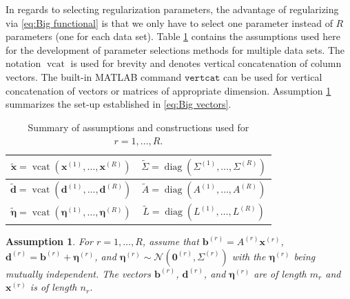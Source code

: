 \documentclass[12pt]{article}
\newcommand{\mA}{m}	%
\newcommand{\bVec}{\mathbf{b}}	%
\newcommand{\dVec}{\mathbf{d}}	%
\newcommand{\xVec}{\mathbf{x}}	%
\DeclareMathOperator{\diag}{diag}	%
\DeclareMathOperator{\vcat}{vcat}	%
\newcommand{\xBig}{\widetilde{\xVec}}	%
\newcommand{\dBig}{\widetilde{\dVec}}	%
\newcommand{\ABig}{\widetilde{A}}	%
\newcommand{\LBig}{\widetilde{L}}	%
\newcommand{\noise}{\eta}	%
\newcommand{\noiseVec}{\bm{\noise}}	%
\newcommand{\zeroVec}{\bm{0}}	%
\newtheorem{assumption}{Assumption}
\begin{document}
In regards to selecting regularization parameters, the advantage of regularizing via \eqref{eq:Big functional} is that we only have to select one parameter instead of $R$ parameters (one for each data set). Table \ref{tab:System assumptions} contains the assumptions used here for the development of parameter selections methods for multiple data sets. The notation $\vcat$ is used for brevity and denotes vertical concatenation of column vectors. The built-in MATLAB command $\mathtt{vertcat}$ can be used for vertical concatenation of vectors or matrices of appropriate dimension. Assumption \ref{Assumption_System} summarizes the set-up established in \eqref{eq:Big vectors}.

\begin{table}[ht!]
  \begin{center}
    \caption{Summary of assumptions and constructions used for $r = 1,\ldots,R$.}
    \label{tab:System assumptions}
    \begin{tabular}{|c|c|}
    \hline
    $\xBig = \vcat\left(\xVec^{(1)},\ldots,\xVec^{(R)}\right)$ & $\widetilde{\Sigma} = \diag\left(\Sigma^{(1)},\ldots,\Sigma^{(R)}\right)$ \\
    \hline
    $\dBig = \vcat\left(\dVec^{(1)},\ldots,\dVec^{(R)}\right)$ & $\ABig = \diag\left(A^{(1)},\ldots,A^{(R)}\right)$ \\
    \hline
    $\widetilde{\noiseVec} = \vcat\left(\noiseVec^{(1)},\ldots,\noiseVec^{(R)}\right)$ & $\LBig = \diag\left(L^{(1)},\ldots,L^{(R)}\right)$ \\
    \hline
    \end{tabular}
  \end{center}
\end{table}

\begin{assumption}
\label{Assumption_System}
For $r = 1,\ldots,R$, assume that $\bVec^{(r)} = {A^{(r)}}\xVec^{(r)}$, $\dVec^{(r)} = \bVec^{(r)} + \noiseVec^{(r)}$, and $\noiseVec^{(r)} \sim \mathcal{N}(\zeroVec^{(r)},\Sigma^{(r)})$ with the $\noiseVec^{(r)}$ being mutually independent. The vectors $\bVec^{(r)}$, $\dVec^{(r)}$, and $\noiseVec^{(r)}$ are of length $\mA_r$ and $\xVec^{(r)}$ is of length $n_r$.
\end{assumption}
\end{document}
